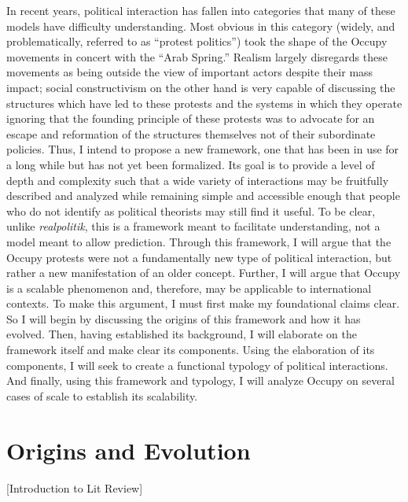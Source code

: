 \documentclass{article}
\begin{document}
In recent years, political interaction has fallen into categories that many of these models have difficulty understanding. 
Most obvious in this category (widely, and problematically, referred to as ``protest politics'') took the shape of the Occupy movements in concert with the ``Arab Spring.'' 
Realism largely disregards these movements as being outside the view of important actors despite their mass impact; social constructivism on the other hand is very capable of discussing the structures which have led to these protests and the systems in which they operate ignoring that the founding principle of these protests was to advocate for an escape and reformation of the structures themselves not of their subordinate policies. 
Thus, I intend to propose a new framework, one that has been in use for a long while but has not yet been formalized. 
Its goal is to provide a level of depth and complexity such that a wide variety of interactions may be fruitfully described and analyzed while remaining simple and accessible enough that people who do not identify as political theorists may still find it useful. 
To be clear, unlike \textit{realpolitik}, this is a framework meant to facilitate understanding, not a model meant to allow prediction. 
Through this framework, I will argue that the Occupy protests were not a fundamentally new type of political interaction, but rather a new manifestation of an older concept. 
Further, I will argue that Occupy is a scalable phenomenon and, therefore, may be applicable to international contexts. 
To make this argument, I must first make my foundational claims clear. 
So I will begin by discussing the origins of this framework and how it has evolved. 
Then, having established its background, I will elaborate on the framework itself and make clear its components. 
Using the elaboration of its components, I will seek to create a functional typology of political interactions. 
And finally, using this framework and typology, I will analyze Occupy on several cases of scale to establish its scalability.

\section{Origins and Evolution}
[Introduction to Lit Review]
\end{document}
